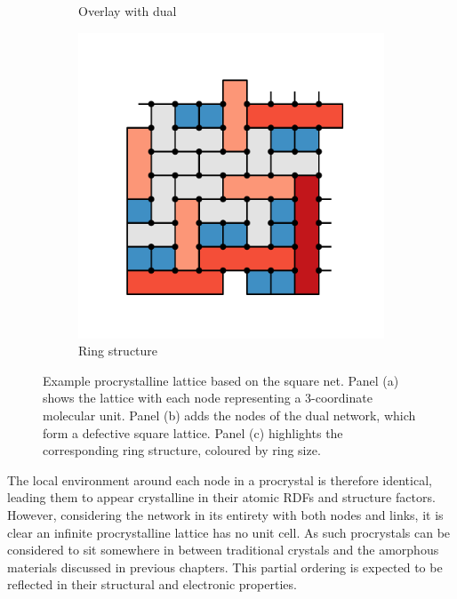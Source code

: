 \begin{figure}[bt]
\begin{subfigure}[b]{0.3\textwidth}
         \caption{Overlay with dual}
         \label{fig:prointrob}
     \end{subfigure}
     \hfill
     \begin{subfigure}[b]{0.3\textwidth}
         \centering
         \includegraphics[width=\textwidth]{./figures/procrystals/pro_intro2.pdf}
         \caption{Ring structure}
         \label{fig:prointroc}
     \end{subfigure}
     
     \caption{Example procrystalline lattice based on the square net. Panel (a) shows the lattice with each node representing a 3\--coordinate molecular unit. Panel (b) adds the nodes of the dual network, which form a defective square lattice. Panel (c) highlights the corresponding ring structure, coloured by ring size.}
     \label{fig:nprointro}
\end{figure}

The local environment around each node in a procrystal is therefore identical, leading them to appear crystalline in their atomic RDFs and structure factors. 
However, considering the network in its entirety with both nodes and links, it is clear an infinite procrystalline lattice has no unit cell.
As such procrystals can be considered to sit somewhere in between traditional crystals and the amorphous materials discussed in previous chapters.
This partial ordering is expected to be reflected in their structural and electronic properties.


